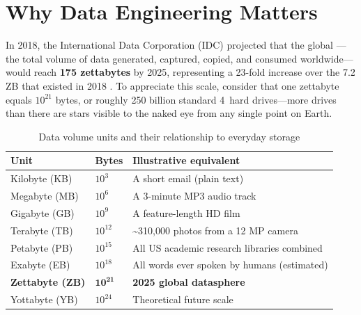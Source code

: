 \section{Why Data Engineering Matters}
\label{sec:why-de}

In 2018, the International Data Corporation (IDC) projected that the
global ---the total volume of data generated, captured,
copied, and consumed worldwide---would reach \textbf{175 zettabytes} by
2025, representing a 23-fold increase over the 7.2 ZB that existed in
2018 \parencite{IDC2018}. To appreciate this scale, consider that one
zettabyte equals $10^{21}$ bytes, or roughly 250 billion standard 4\TB\
hard drives---more drives than there are stars visible to the naked eye
from any single point on Earth.

\begin{table}[h!t]
\centering
\caption{Data volume units and their relationship to everyday storage}
\label{tab:volume-units}
\renewcommand{\arraystretch}{1.3}
\begin{tabular}{L{2.4cm} R{2.4cm} L{6.0cm}}
\toprule
\textbf{Unit} & \textbf{Bytes} & \textbf{Illustrative equivalent} \\
\midrule
Kilobyte (KB)   & $10^{3}$  & A short email (plain text) \\
Megabyte (MB)   & $10^{6}$  & A 3-minute MP3 audio track \\
Gigabyte (GB)   & $10^{9}$  & A feature-length HD film \\
Terabyte (TB)   & $10^{12}$ & \textasciitilde310,000 photos from a 12 MP camera \\
Petabyte (PB)   & $10^{15}$ & All US academic research libraries combined \\
Exabyte (EB)    & $10^{18}$ & All words ever spoken by humans (estimated) \\
\textbf{Zettabyte (ZB)}  & $\mathbf{10^{21}}$ & \textbf{2025 global datasphere} \\
Yottabyte (YB)  & $10^{24}$ & Theoretical future scale \\
\bottomrule
\end{tabular}
\end{table}


